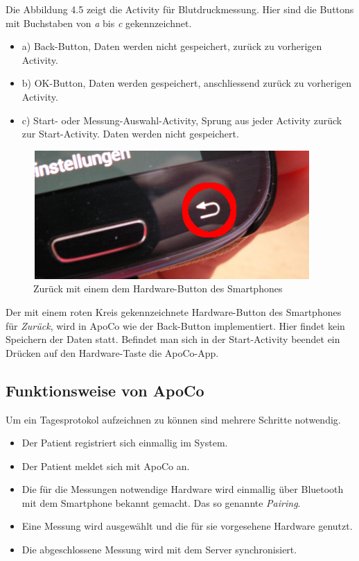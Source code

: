 Die Abbildung 4.5 zeigt die Activity f\"ur Blutdruckmessung.
Hier sind die Buttons mit Buchstaben von \emph{a} bis \emph{c} gekennzeichnet.
\begin{itemize}
 \item a) Back-Button, Daten werden nicht gespeichert, zur\"uck zu vorherigen Activity. 
 \item b) OK-Button, Daten werden gespeichert, anschliessend zur\"uck zu vorherigen Activity.
 \item c) Start- oder Messung-Auswahl-Activity, Sprung aus jeder Activity zur\"uck zur Start-Activity. Daten werden nicht gespeichert. 
\end{itemize}

\begin{figure}[h]
  \centering
  \includegraphics[scale=0.5]{screenshots/kapitel4/gui/hd_backbtn.png}
  \caption{Zur\"uck mit einem dem Hardware-Button des Smartphones}
  
\end{figure}

Der mit einem roten Kreis gekennzeichnete Hardware-Button des Smartphones f\"ur \emph{Zur\"uck}, wird in ApoCo wie der Back-Button implementiert.
Hier findet kein Speichern der Daten statt.
Befindet man sich in der Start-Activity beendet ein Dr\"ucken auf den Hardware-Taste die ApoCo-App.\\


\subsection{Funktionsweise von ApoCo}

Um ein Tagesprotokol aufzeichnen zu k\"onnen sind mehrere Schritte notwendig.
\begin{itemize}
 \item Der Patient registriert sich einmallig im System.
 \item Der Patient meldet sich mit ApoCo an.
 \item Die f\"ur die Messungen notwendige Hardware wird einmallig \"uber Bluetooth mit dem Smartphone bekannt gemacht. Das so genannte \emph{Pairing}.
 \item Eine Messung wird ausgew\"ahlt und die f\"ur sie vorgesehene Hardware genutzt.
 \item Die abgeschlossene Messung wird mit dem Server synchronisiert.
\end{itemize}

